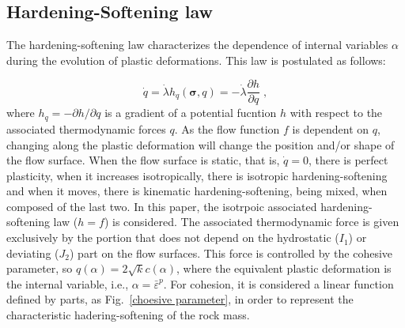 \documentclass[Journal,letterpaper]{ascelike-new}
\newcommand{\hl}{{h_q}}
\newcommand{\strainpeq}{\bar \varepsilon^p}
\newcommand{\stress}{\boldsymbol{\sigma}}
\begin{document}
\subsection{Hardening-Softening law}

The hardening-softening law characterizes the dependence of internal variables $\alpha$ during the evolution of plastic deformations. This law is postulated as follows:

\begin{equation} \label{eq_hardening_law}
	\dot q = \dot \lambda \hl(\stress,q) = - \dot \lambda \dfrac{\partial h}{\partial q}\;,
\end{equation}
where $\hl = -\partial h / \partial q$ is a gradient of a potential fucntion $h$ with respect to the associated thermodynamic forces $q$. As the flow function $f$ is dependent on $q$, changing along the plastic deformation will change the position and/or shape of the flow surface. When the flow surface is static, that is, $\dot q = 0$, there is perfect plasticity, when it increases isotropically, there is isotropic hardening-softening and when it moves, there is kinematic hardening-softening, being mixed, when composed of the last two. In this paper, the isotrpoic associated hardening-softening law ($h=f$) is considered. The associated thermodynamic force is given exclusively by the portion that does not depend on the hydrostatic ($I_1$) or deviating ($J_2$) part on the flow surfaces. This force is controlled by the cohesive parameter, so $q(\alpha) =  2\sqrt{k}c(\alpha)$, where the equivalent plastic deformation is the internal variable, i.e., $\alpha = \strainpeq$. For cohesion, it is considered a linear function defined by parts, as Fig.~\ref{choesive parameter}, in order to represent the characteristic hadering-softening of the rock mass.
\end{document}

